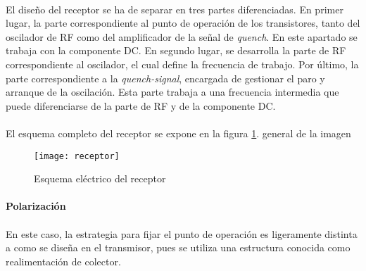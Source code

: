 \paragraph{}
El diseño del receptor se ha de separar en tres partes diferenciadas.
En primer lugar, la parte correspondiente al punto de operación de los transistores, tanto del oscilador de RF como del amplificador de la señal de \textit{quench}. En este apartado se trabaja con la componente DC.
En segundo lugar, se desarrolla la parte de RF correspondiente al oscilador, el cual define la frecuencia de trabajo. 
Por último, la parte correspondiente a la \textit{quench-signal}, encargada de gestionar el paro y arranque de la oscilación. Esta parte trabaja a una frecuencia intermedia que puede diferenciarse de la parte de RF y de la componente DC.

\paragraph{}
El esquema completo del receptor se expone en la figura \ref{fig:rx}. general de la imagen
\begin{figure}[h]
    \centering
    \texttt{[image: receptor]}
    \caption{Esquema el\'ectrico del receptor}
    \label{fig:rx}
\end{figure}

\paragraph{Polarización} %
\paragraph{}
En este caso, la estrategia para fijar el punto de operación es ligeramente distinta a como se diseña en el transmisor, pues se utiliza una estructura conocida como realimentaci\'on de colector. 

